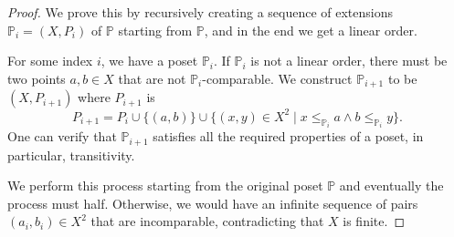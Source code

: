 \begin{proof}
    We prove this by recursively creating a sequence of extensions $\mathbb{P}_i = (X,P_i)$ of $\mathbb{P}$ starting from $\mathbb{P}$, and in the end we get a linear order.

    For some index $i$, we have a poset $\mathbb{P}_i$. If $\mathbb{P}_i$ is not a linear order, there must be two points $a,b \in X$ that are not $\mathbb{P}_i$-comparable. We construct $\mathbb{P}_{i+1}$ to be $(X,P_{i+1})$ where $P_{i+1}$ is
    $$
    P_{i+1} = P_i \cup \{ (a,b) \} \cup \{ (x,y) \in X^2 \mid x \leq_{\mathbb{P}_i} a \land b \leq_{\mathbb{P}_i} y \}.
    $$
    One can verify that $\mathbb{P}_{i+1}$ satisfies all the required properties of a poset, in particular, transitivity.

    We perform this process starting from the original poset $\mathbb{P}$ and eventually the process must half. Otherwise, we would have an infinite sequence of pairs $(a_i,b_i) \in X^2$ that are incomparable, contradicting that $X$ is finite.
\end{proof}

